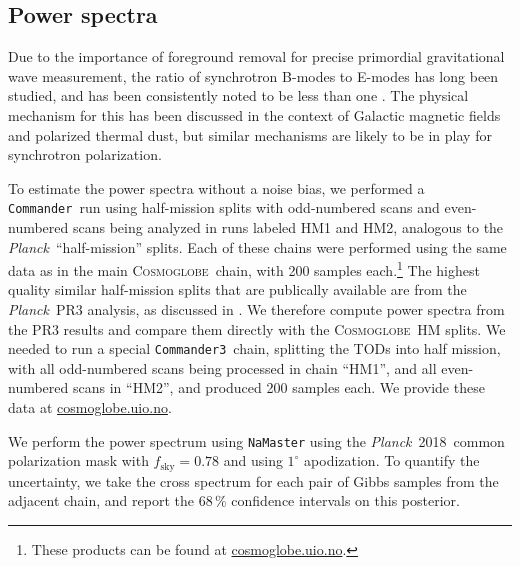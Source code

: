 \documentclass[twocolumn]{../../common/aa}
\def\Planck{\emph{Planck}}
\def\commander{\texttt{Commander}}
\def\commanderthree{\texttt{Commander3}}
\newcommand{\cosmoglobe}{\textsc{Cosmoglobe}}
\begin{document}
\subsection{Power spectra}


Due to the importance of foreground removal for precise primordial gravitational wave measurement, the ratio of synchrotron B-modes to E-modes has long been studied, and has been consistently noted to be less than one \citep{page2007,planck2014-a12,planck2016-l04}. The physical mechanism for this has been discussed in the context of Galactic magnetic fields and polarized thermal dust, but similar mechanisms are likely to be in play for synchrotron polarization.

To estimate the power spectra without a noise bias, we performed a \commander\ run using half-mission splits with odd-numbered scans and even-numbered scans being analyzed in runs labeled HM1 and HM2, analogous to the \Planck\ ``half-mission'' splits. Each of these chains were performed using the same data as in the main \cosmoglobe\ chain, with 200 samples each.\footnote{These products can be found at \url{cosmoglobe.uio.no}.}
The highest quality similar half-mission splits that are publically available are from the \Planck\ PR3 analysis, as discussed in \citet{planck2016-l04}. We therefore compute power spectra from the PR3 results and compare them directly with the \cosmoglobe\ HM splits.
We needed to run a special \commanderthree\ chain, splitting the TODs into half mission, with all odd-numbered scans being processed in chain ``HM1'', and all even-numbered scans in ``HM2'', and produced 200 samples each. We provide these data at \url{cosmoglobe.uio.no}.


We perform the power spectrum using \texttt{NaMaster} \citep{namaster} using the \Planck\ 2018\ common polarization mask with $f_\mathrm{sky}=0.78$ and using $1^\circ$ apodization.
To quantify the uncertainty, we take the cross spectrum for each pair of Gibbs samples from the adjacent chain, and report the 68\,\% confidence intervals on this posterior. 

\end{document}
